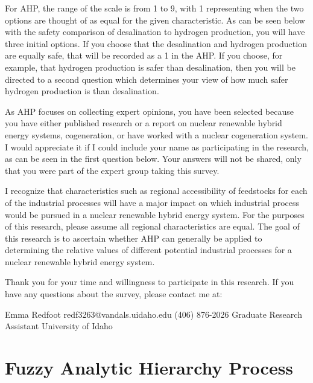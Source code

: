 \documentclass[12pt]{UIdahoMastersThesis}
\begin{document}
For AHP,  the range of the scale is from 1 to 9, with 1 representing when the two options are thought of as equal for the given characteristic. As can be seen below with the safety comparison of desalination to hydrogen production, you will have three initial options. If you choose that the desalination and hydrogen production are equally safe, that will be recorded as a 1 in the AHP. If you choose, for example, that hydrogen production is safer than desalination, then you will be directed to a second question which determines your view of how much safer hydrogen production is than desalination.

As AHP focuses on collecting expert opinions, you have been selected because you have either published research or a report on nuclear renewable hybrid energy systems, cogeneration, or have worked with a nuclear cogeneration system. I would appreciate it if I could include your name as participating in the research, as can be seen in the first question below.  Your answers will not be shared, only that you were part of the expert group taking this survey.

I recognize that characteristics such as regional accessibility of feedstocks for each of the industrial processes will have a major impact on which industrial process would be pursued in a nuclear renewable hybrid energy system. For the purposes of this research, please assume all regional characteristics are equal.  The goal of this research is to ascertain whether AHP can generally be applied to determining the relative values of different potential industrial processes for a nuclear renewable hybrid energy system.

Thank you for your time and willingness to participate in this research. If you have any questions about the survey, please contact me at:

Emma Redfoot
redf3263@vandals.uidaho.edu
(406) 876-2026
Graduate Research Assistant
University of Idaho



\chapter{Fuzzy Analytic Hierarchy Process}
\label{App:FAHP}
\end{document}
